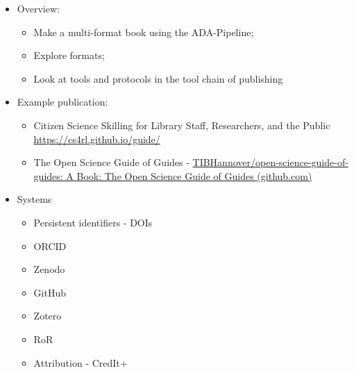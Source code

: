 \documentclass{article}
\begin{document}
\begin{itemize}
\item Overview: 

\begin{itemize}
\item Make a multi-format book using the ADA-Pipeline; 


\item Explore formats; 


\item Look at tools and protocols in the tool chain of publishing


\end{itemize}

\end{itemize}
\begin{itemize}
\item Example publication: 

\begin{itemize}
\item Citizen Science Skilling for Library Staff, Researchers, and the Public \href{https://cs4rl.github.io/guide/}{https://cs4rl.github.io/guide/}


\end{itemize}
\begin{itemize}
\item The Open Science Guide of Guides - \href{https://github.com/TIBHannover/open-science-guide-of-guides}{TIBHannover/open-science-guide-of-guides: A Book: The Open Science Guide of Guides (github.com)}


\end{itemize}

\item Systems

\begin{itemize}
\item Persistent identifiers - DOIs


\end{itemize}
\begin{itemize}
\item ORCID


\end{itemize}
\begin{itemize}
\item Zenodo


\end{itemize}
\begin{itemize}
\item GitHub


\end{itemize}
\begin{itemize}
\item Zotero


\end{itemize}
\begin{itemize}
\item RoR


\end{itemize}
\begin{itemize}
\item Attribution - CredIt+


\end{itemize}

\end{itemize}
\end{document}
